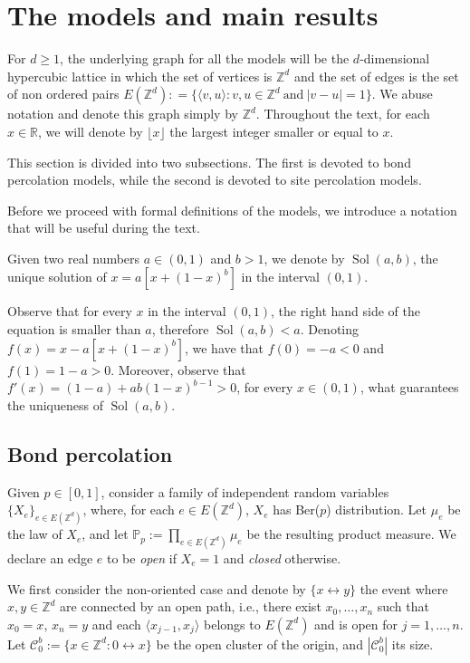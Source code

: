 \documentclass{aptpub}
\newcommand{\R}{\mathbb{R}}
\newcommand{\Z}{\mathbb{Z}}
\newcommand{\Pp}{\mathbb{P}}
\DeclareMathOperator{\Sol}{Sol}
\begin{document}
\section{The models and main results}\label{sec:model}

For $d \geq 1$, the underlying graph for all the models will be the $d$-dimensional hypercubic lattice in which the set of vertices is $\Z^d$ and the set of edges is the set of non ordered pairs $E(\Z^d) : = \{ \langle v, u \rangle : v, u \in \Z^d ~ \text{and} ~ |v-u| =1\}$. We abuse notation and denote this graph simply by $\Z^d$. Throughout the text, for each $x \in \R$, we will denote by $\lfloor x \rfloor$ the largest integer smaller or equal to $x$.

This section is divided into two subsections. The first is devoted to bond percolation models, while the second is devoted to site percolation models.


Before we proceed with formal definitions of the models, we introduce a notation that will be useful during the text.

\begin{definition}\label{Rsol}
Given two real numbers $a \in (0,1)$ and $b > 1$, we denote by $\Sol(a,b)$, the unique solution of $x = a[x + (1-x)^b]$ in the interval $(0,1)$.
\end{definition}



     Observe that for every $x$ in the interval $(0,1)$, the right hand side of the equation is smaller than $a$, therefore $\Sol(a,b) < a$. Denoting $f(x) = x - a[x + (1-x)^b]$, we have that $f(0) = -a < 0$ and $f(1) = 1 - a > 0$. Moreover, observe that $f'(x) = (1 - a) + ab(1-x)^{b-1} > 0$, for every $x \in (0,1)$, what guarantees the uniqueness of $\Sol(a,b)$. 




\medskip

\subsection{Bond percolation}

Given  $p \in [0,1]$, consider a family of independent random variables $\{X_e\}_{e \in E(\Z^d)}$, where, for each $e \in E(\Z^d)$, $X_e$ has Ber($p$) distribution. Let $\mu_e$ be the law of $X_e$, and let $\Pp_p := \prod_{e \in E(\Z^d)} \mu_e$ be the resulting product measure. We declare an edge $e$ to be {\it open} if $X_e=1$ and {\it closed} otherwise. 

We first consider the non-oriented case and denote by $\{x \leftrightarrow y\}$ the event where  $x, y \in \Z^d$ are connected by an open path, i.e., there exist $x_0, \dots, x_n$ such that $x_0 = x$, $x_n =y$ and each $\langle x_{j-1}, x_j \rangle$ belongs to $ E(\Z^d)$ and is open for $j=1, \dots, n$. Let  $\mathcal{C}^b_0 := \{ x \in \Z^d:  0 \leftrightarrow x\}$ be the open cluster of the origin, and $|\mathcal{C}^b_0|$ its size.
\end{document}
